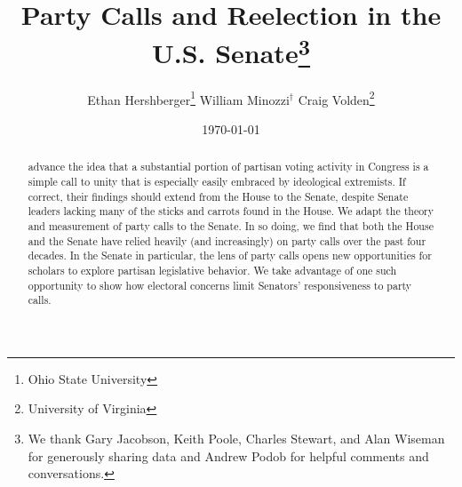 \documentclass[12pt]{article}
\begin{document}


\title{Party Calls and Reelection in the U.S. Senate\thanks{
We thank Gary Jacobson, Keith Poole, Charles Stewart,
and Alan Wiseman for generously sharing data
and Andrew Podob for helpful comments and conversations.
}
}

\author{
Ethan Hershberger\thanks{
  \small Ohio State University
}\quad
William Minozzi$^\dagger$\quad
Craig Volden\thanks{
  \small University of Virginia
}\\
}

\date{\today}

\maketitle

\thispagestyle{empty}
\setcounter{page}{0}

\begin{abstract}
\doublespacing
\noindent
\cite{Minozzi:2013} advance the idea that a substantial portion of partisan voting activity in Congress is a simple call to unity that is especially easily embraced by ideological extremists.  If correct, their findings should extend from the House to the Senate, despite Senate leaders lacking many of the sticks and carrots found in the House.  We adapt the theory and measurement of party calls to the Senate.  In so doing, we find that both the House and the Senate have relied heavily (and increasingly) on party calls over the past four decades.  In the Senate in particular, the lens of party calls opens new opportunities for scholars to explore partisan legislative behavior.  We take advantage of one such opportunity to show how electoral concerns limit Senators' responsiveness to party calls.
\end{abstract}

\clearpage

\doublespacing

\end{document}
